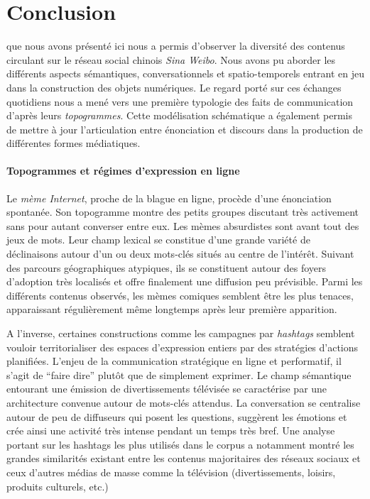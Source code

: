 \chapter*{Conclusion}

 que nous avons présenté ici nous a permis d'observer la diversité des contenus circulant sur le réseau social chinois \textit{Sina Weibo}. Nous avons pu aborder les différents aspects sémantiques, conversationnels et spatio-temporels entrant en jeu dans la construction des objets numériques. Le regard porté sur ces échanges quotidiens nous a mené vers une première typologie des faits de communication d'après leurs \textit{topogrammes}. Cette modélisation schématique a également permis de mettre à jour l'articulation entre énonciation et discours dans la production de différentes formes médiatiques.

\subsubsection{Topogrammes et régimes d'expression en ligne}
Le \textit{mème Internet}, proche de la blague en ligne, procède d'une énonciation spontanée. Son topogramme montre des petits groupes discutant très activement sans pour autant converser entre eux. Les mèmes absurdistes sont avant tout des jeux de mots. Leur champ lexical se constitue d'une grande variété de déclinaisons autour d'un ou deux mots-clés situés au centre de l'intérêt. Suivant des parcours géographiques atypiques, ils se constituent autour des foyers d'adoption très localisés et offre finalement une diffusion peu prévisible. Parmi les différents contenus observés, les mèmes comiques semblent être les plus tenaces, apparaissant régulièrement même longtemps après leur première apparition.

A l'inverse, certaines constructions comme les campagnes par \textit{hashtags} semblent vouloir territorialiser des espaces d'expression entiers par des stratégies d'actions planifiées. L'enjeu de la communication stratégique en ligne et performatif, il s'agit de ``faire dire'' plutôt que de simplement exprimer. Le champ sémantique entourant une émission de divertissements télévisée se caractérise par une architecture convenue autour de mots-clés attendus. La conversation se centralise autour de peu de diffuseurs qui posent les questions, suggèrent les émotions et crée ainsi une activité très intense pendant un temps très bref. Une analyse portant sur les hashtags les plus utilisés dans le corpus a notamment montré les grandes similarités existant entre les contenus majoritaires des réseaux sociaux et ceux d'autres médias de masse comme la télévision (divertissements, loisirs, produits culturels, etc.)

